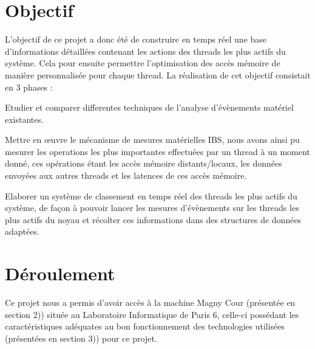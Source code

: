 	\section{Objectif}
		L'objectif de ce projet a donc été de construire en temps réel une base d'informations détaillées contenant les actions des threads les plus actifs du système. Cela pour ensuite permettre l'optimisation des accès mémoire de manière personnalisée pour chaque thread. La réalisation de cet objectif consistait en 3 phases :
		\bitem
			\item{Etudier et comparer differentes techniques de l'analyse d'évènements matériel existantes.}
			\item{Mettre en \oe uvre le mécanisme de mesures matérielles IBS, nous avons ainsi pu mesurer les operations les plus importantes effectuées par un thread à un moment donné, ces opérations étant les accès mémoire distants/locaux, les données envoyées aux autres threads et les latences de ces accès mémoire.}
			\item{Elaborer un système de classement en temps réel des threads les plus actifs du système, de façon à pouvoir lancer les mesures d'évènements sur les threads les plus actifs du noyau et récolter ces informations dans des structures de données adaptées.}
		\eitem
	\section{Déroulement}
		Ce projet nous a permis d'avoir accès à la machine Magny Cour (présentée en section 2)) située au Laboratoire Informatique de Paris 6, celle-ci possédant les caractéristiques adéquates au bon fonctionnement des technologies utilisées (présentées en section 3)) pour ce projet.\\
